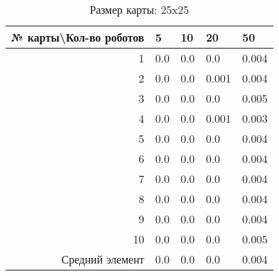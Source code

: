 \begin{table}[H]
\centering
\begin{tabular}{|r|l|l|l|l|}
\hline
№ карты\textbackslash Кол-во роботов & \textbf{5} & \textbf{10} & \textbf{20} & \textbf{50}\\ \hline
1 & 0.0 & 0.0 & 0.0 & 0.004\\ \hline
2 & 0.0 & 0.0 & 0.001 & 0.004\\ \hline
3 & 0.0 & 0.0 & 0.0 & 0.005\\ \hline
4 & 0.0 & 0.0 & 0.001 & 0.003\\ \hline
5 & 0.0 & 0.0 & 0.0 & 0.004\\ \hline
6 & 0.0 & 0.0 & 0.0 & 0.004\\ \hline
7 & 0.0 & 0.0 & 0.0 & 0.004\\ \hline
8 & 0.0 & 0.0 & 0.0 & 0.004\\ \hline
9 & 0.0 & 0.0 & 0.0 & 0.004\\ \hline
10 & 0.0 & 0.0 & 0.0 & 0.005\\ \hline
Средний элемент & 0.0 & 0.0 & 0.0 & 0.004\\ \hline
\end{tabular}
\caption*{Размер карты: 25x25}
\end{table}
